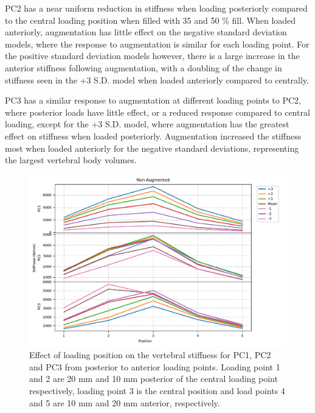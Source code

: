 PC2 has a near uniform reduction in stiffness when loading posteriorly compared
to the central loading position when filled with 35 and 50 \% fill.  When
loaded anteriorly, augmentation has little effect on the negative standard
deviation models, where the response to augmentation is similar for each
loading point.  For the positive standard deviation models however, there is a
large increase in the anterior stiffness following augmentation, with a
doubling of the change in stiffness seen in the +3 S.D. model when loaded
anteriorly compared to centrally.

PC3 has a similar response to augmentation at different loading points to PC2,
where posterior loads have little effect, or a reduced response compared to
central loading, except for the +3 S.D. model, where augmentation has the
greatest effect on stiffness when loaded posteriorly.  Augmentation increased
the stiffness most when loaded anteriorly for the negative standard deviations,
representing the largest vertebral body volumes.

\begin{figure}[p]
  \centering
  \includegraphics[width=.9\textheight, angle=90]{Chapters/Chapter_PCA_images/AP_LP_non_aug.pdf}
  \caption[Effect of loading position on the vertebral stiffness.]{Effect of
	loading position on the vertebral stiffness for PC1, PC2 and PC3 from
	posterior to anterior loading points. Loading point 1 and 2 are 20 mm
	and 10 mm posterior of the central loading point respectively, loading
	point 3 is the central position and load points 4 and 5 are 10 mm and
	20 mm anterior, respectively. }
  \label{fig:AP_LP_non_aug}
\end{figure}

